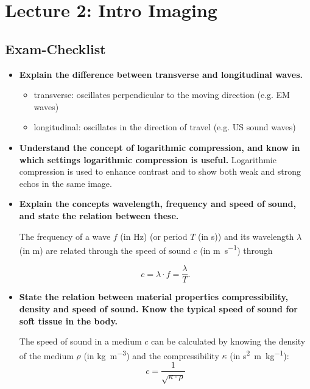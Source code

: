 \documentclass[10pt,a4paper,noendnumber=true]{scrartcl}
\begin{document}
\newpage
\section{Lecture 2: Intro Imaging}

\subsection{Exam-Checklist}
\begin{itemize}
\item \textbf{Explain the difference between transverse and longitudinal waves.}

\begin{itemize}
\item transverse: oscillates perpendicular to the moving direction (e.g. EM waves)
\item longitudinal: oscillates in the direction of travel (e.g. US sound waves)
\end{itemize}

\item \textbf{Understand the concept of logarithmic compression, and know in which settings logarithmic compression is useful.}
Logarithmic compression is used to enhance contrast and to show both weak and strong echos in the same image.

\item \textbf{Explain the concepts wavelength, frequency and speed of sound, and state the relation between these.}

The frequency of a wave $f$ (in \si{\hertz}) (or period $T$ (in \si{\s})) and its wavelength $\lambda$ (in \si{\m}) are related through the speed of sound $c$ (in \si{\m\per\s}) through

\begin{equation}
c =  \lambda \cdot f = \frac{\lambda}{T}.
\end{equation}

\item \textbf{State the relation between material properties compressibility, density and speed of sound. Know the typical speed of sound for soft tissue in the body.}

The speed of sound in a medium $c$ can be calculated by knowing the density of the medium $\rho$ (in \si{\kg\per\m\cubed}) and the compressibility $\kappa$ (in \si{\s\squared\m\per\kg}):
\begin{equation}
c=\frac{1}{\sqrt{\kappa\cdot\rho}}
\end{equation}


\end{itemize}
\end{document}
